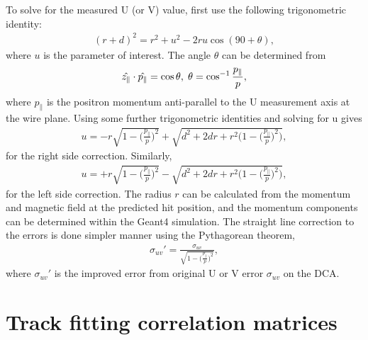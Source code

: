 To solve for the measured U (or V) value, first use the following trigonometric identity:
	\begin{align}
		(r+d)^{2} = r^{2}+u^{2}-2ru\cos(90+\theta),
	\end{align}
where $u$ is the parameter of interest. The angle $\theta$ can be determined from 
	\begin{align}
		\hat{z_{\parallel}} \cdot \hat{p_{\parallel}} = \cos{\theta}, \hspace{.1cm} \theta = \cos^{-1}{\frac{p_{\parallel}}{p}}, 
	\end{align}
where $p_{\parallel}$ is the positron momentum anti-parallel to the U measurement axis at the wire plane. Using some further trigonometric identities and solving for u gives
	\begin{align}
		u = -r\sqrt{1-\Big(\frac{p_{\parallel}}{p}\Big)^{2}} + \sqrt{d^{2} + 2dr + r^{2}\Big(1-\Big(\frac{p_{\parallel}}{p}\Big)^{2}\Big)},
	\end{align}
for the right side correction. Similarly,  
	\begin{align}
		u = +r\sqrt{1-\Big(\frac{p_{\parallel}}{p}\Big)^{2}} - \sqrt{d^{2} + 2dr + r^{2}\Big(1-\Big(\frac{p_{\parallel}}{p}\Big)^{2}\Big)},
	\end{align}
for the left side correction. The radius $r$ can be calculated from the momentum and magnetic field at the predicted hit position, and the momentum components can be determined within the Geant4 simulation. The straight line correction to the errors is done simpler manner using the Pythagorean theorem, 
	\begin{align}
		\sigma_{uv}' = \frac{\sigma_{uv}}{\sqrt{1-\big(\frac{p_{\parallel}}{p}\big)^{2}}},
	\end{align}
where $\sigma_{uv}'$ is the improved error from original U or V error $\sigma_{uv}$ on the DCA.



\section{Track fitting correlation matrices}
\label{app:trackingCorrMatrices}


